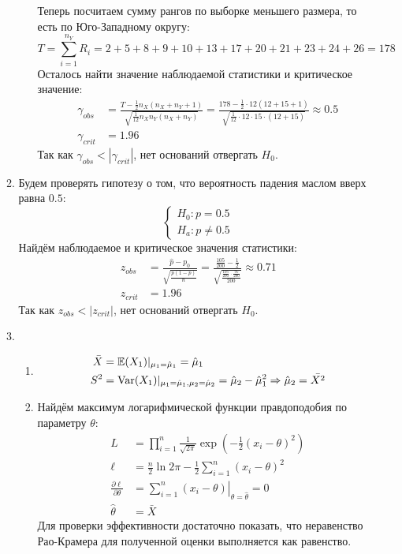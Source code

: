 \begin{enumerate}[resume]
\begin{enumerate}
\begin{enumerate}
Теперь посчитаем сумму рангов по выборке меньшего размера, то есть по Юго-Западному округу:
\[
T = \sum_{i=1}^{n_Y} R_i = 2 + 5 + 8 + 9 + 10 + 13 + 17 + 20 + 21 + 23 + 24 + 26 = 178
\]
Осталось найти значение наблюдаемой статистики и критическое значение:
\begin{align*}
\gamma_{obs} &= \frac{T - \frac{1}{2} n_X (n_X + n_Y + 1)}{\sqrt{\frac{1}{12} n_X n_Y (n_X + n_Y)} } = \frac{178 - \frac{1}{2} \cdot 12 (12 + 15 + 1)}{\sqrt{\frac{1}{12} \cdot 12 \cdot 15 \cdot(12 + 15)}} \approx 0.5 \\
\gamma_{crit} &= 1.96
\end{align*}
Так как $\gamma_{obs} < |\gamma_{crit}|$, нет оснований отвергать $H_0$.
\end{enumerate}
\item Будем проверять гипотезу о том, что вероятность падения маслом вверх равна $0.5$:
\[
\begin{cases}
H_0: p = 0.5 \\
H_a: p \neq 0.5
\end{cases}
\]
Найдём наблюдаемое и критическое значения статистики:
\begin{align*}
z_{obs} &= \frac{\hat p - p_0}{\sqrt{\frac{\hat p (1 - \hat p)}{n}}} = \frac{\frac{105}{200} - \frac{1}{2}}{\sqrt{\frac{\frac{105}{200} \cdot \frac{95}{200}}{200}}} \approx 0.71 \\
z_{crit} &= 1.96
\end{align*}
Так как $z_{obs} < |z_{crit}|$, нет оснований отвергать $H_0$.

\item
\begin{enumerate}
\item
\begin{align*}
\bar X &= \operatorname{\mathbb{E}}(X_1) |_{\mu_1 = \hat{\mu}_1} = \hat{\mu}_1 \\
S^2 &= \operatorname{Var}(X_1) |_{\mu_1 = \hat{\mu}_1, \mu_2= \hat{\mu}_2} = \hat{\mu}_2 - \hat{\mu}_1^2 \Rightarrow \hat{\mu}_2 = \bar{X^2}
\end{align*}
\item Найдём максимум логарифмической функции правдоподобия по параметру $\theta$:
\begin{align*}
L &= \prod_{i=1}^n \frac{1}{\sqrt{2\pi}} \exp \left(-\frac{1}{2} (x_i - \theta)^2\right) \\
\ell &= \frac{n}{2} \ln 2\pi - \frac{1}{2} \sum_{i=1}^n (x_i - \theta)^2 \\
\frac{\partial \ell}{\partial \theta} &= \left. \sum_{i=1}^n (x_i - \theta) \right|_{\theta = \hat \theta} = 0 \\
\hat \theta &= \bar X
\end{align*}
Для проверки эффективности достаточно показать, что неравенство Рао-Крамера
для полученной оценки выполняется как равенство.


\end{enumerate}
\end{enumerate}
\end{enumerate}
